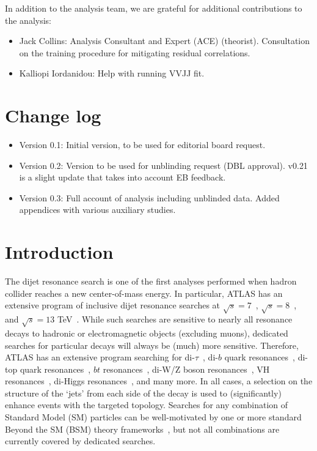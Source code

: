 In addition to the analysis team, we are grateful for additional contributions to the analysis: 

\begin{itemize}
\item Jack Collins: Analysis Consultant and Expert (ACE) (theorist).  Consultation on the training procedure for mitigating residual correlations.
\item Kalliopi Iordanidou: Help with running VVJJ fit.
\end{itemize}

\section{Change log}

\begin{itemize}
\item Version 0.1: Initial version, to be used for editorial board request.
\item Version 0.2: Version to be used for unblinding request (DBL approval).  v0.21 is a slight update that takes into account EB feedback.
\item Version 0.3: Full account of analysis including unblinded data. Added appendices with various auxiliary studies.
\end{itemize}

\clearpage

\section{Introduction}
\label{sec:CWoLa:intro}

The dijet resonance search is one of the first analyses performed when hadron collider reaches a new center-of-mass energy.   In particular, ATLAS has an extensive program of inclusive dijet resonance searches at $\sqrt{s}=7$~\cite{Aad:2010ae,Aad:2011aj,Aad:2011fq}, $\sqrt{s}=8$~\cite{Aad:2014aqa}, and $\sqrt{s}=13$ TeV~\cite{ATLAS:2015nsi,Aaboud:2017yvp,Aaboud:2018fzt}.  While such searches are sensitive to nearly all resonance decays to hadronic or electromagnetic objects (excluding muons), dedicated searches for particular decays will always be (much) more sensitive.  Therefore, ATLAS has an extensive program searching for di-$\tau$~\cite{Aaboud:2016cre,Aaboud:2017sjh}, di-$b$ quark resonances~\cite{Aaboud:2016nbq,Aaboud:2018tqo}, di-top quark resonances~\cite{Aaboud:2018mjh}, $bt$ resonances~\cite{Aaboud:2018juj}, di-W/Z boson resonances~\cite{Aaboud:2016okv,Aaboud:2017fgj,Aaboud:2017itg,Aaboud:2017eta}, VH resonances~\cite{Aaboud:2018eoy,Aaboud:2017cxo,Aaboud:2017ahz}, di-Higgs resonances~\cite{Aaboud:2018knk}, and many more.  In all cases, a selection on the structure of the `jets' from each side of the decay is used to (significantly) enhance events with the targeted topology.  Searches for any combination of Standard Model (SM) particles can be well-motivated by one or more standard Beyond the SM (BSM) theory frameworks~\cite{Craig:2016rqv,Kim:2019rhy,}, but not all combinations are currently covered by dedicated searches.

